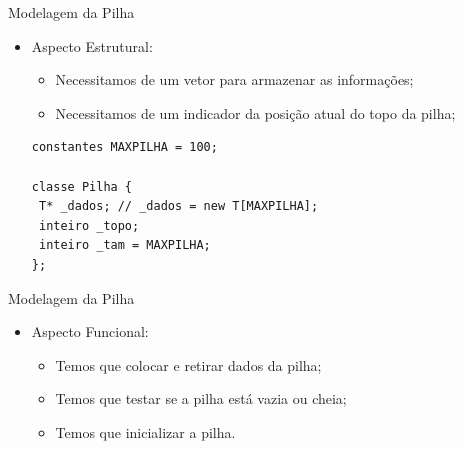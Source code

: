\documentclass[12pt,table,xcolor={dvipsnames}]{beamer}
\begin{document}
\begin{frame}[fragile]{Modelagem da Pilha}

\begin{itemize}
\item Aspecto Estrutural:
\begin{itemize}
\item Necessitamos de um vetor para armazenar as informações;
\item Necessitamos de um indicador da posição atual do topo da pilha;
\end{itemize}
\begin{lstlisting}
constantes MAXPILHA = 100;

classe Pilha {
 T* _dados; // _dados = new T[MAXPILHA];
 inteiro _topo;
 inteiro _tam = MAXPILHA;
};
\end{lstlisting}
\end{itemize}
\end{frame}

\begin{frame}[fragile]{Modelagem da Pilha}

\begin{itemize}
\item Aspecto Funcional:
\begin{itemize}
\item Temos que colocar e retirar dados da pilha;
\item Temos que testar se a pilha está vazia ou cheia;
\item Temos que inicializar a pilha.
\end{itemize}
\end{itemize}
\end{frame}
\end{document}
